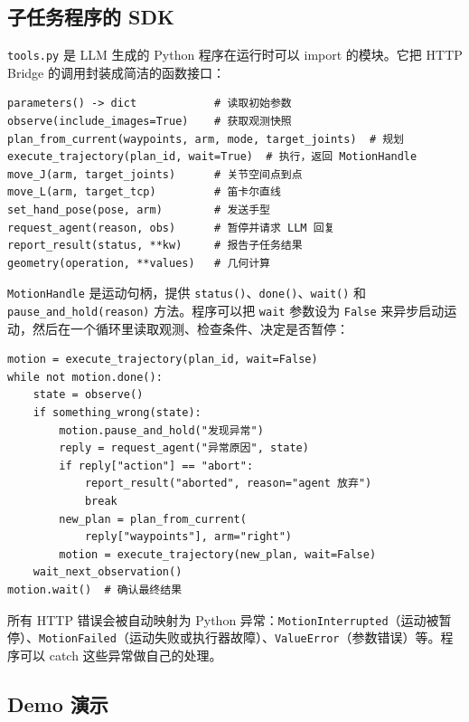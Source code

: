 \subsection{子任务程序的 SDK}
\label{subsec:agent-tools-sdk}

\texttt{tools.py} 是 LLM 生成的 Python 程序在运行时可以 import 的模块。它把 HTTP Bridge 的调用封装成简洁的函数接口：

\begin{lstlisting}[caption={tools.py 提供的主要接口（简化）}]
parameters() -> dict            # 读取初始参数
observe(include_images=True)    # 获取观测快照
plan_from_current(waypoints, arm, mode, target_joints)  # 规划
execute_trajectory(plan_id, wait=True)  # 执行，返回 MotionHandle
move_J(arm, target_joints)      # 关节空间点到点
move_L(arm, target_tcp)         # 笛卡尔直线
set_hand_pose(pose, arm)        # 发送手型
request_agent(reason, obs)      # 暂停并请求 LLM 回复
report_result(status, **kw)     # 报告子任务结果
geometry(operation, **values)   # 几何计算
\end{lstlisting}

\texttt{MotionHandle} 是运动句柄，提供 \texttt{status()}、\texttt{done()}、\texttt{wait()} 和 \texttt{pause\_and\_hold(reason)} 方法。程序可以把 \texttt{wait} 参数设为 \texttt{False} 来异步启动运动，然后在一个循环里读取观测、检查条件、决定是否暂停：

\begin{lstlisting}[caption={异步运动监督模式示例}]
motion = execute_trajectory(plan_id, wait=False)
while not motion.done():
    state = observe()
    if something_wrong(state):
        motion.pause_and_hold("发现异常")
        reply = request_agent("异常原因", state)
        if reply["action"] == "abort":
            report_result("aborted", reason="agent 放弃")
            break
        new_plan = plan_from_current(
            reply["waypoints"], arm="right")
        motion = execute_trajectory(new_plan, wait=False)
    wait_next_observation()
motion.wait()  # 确认最终结果
\end{lstlisting}

所有 HTTP 错误会被自动映射为 Python 异常：\texttt{MotionInterrupted}（运动被暂停）、\texttt{MotionFailed}（运动失败或执行器故障）、\texttt{ValueError}（参数错误）等。程序可以 catch 这些异常做自己的处理。


\subsection{Demo 演示}
\label{subsec:agent-demo}

